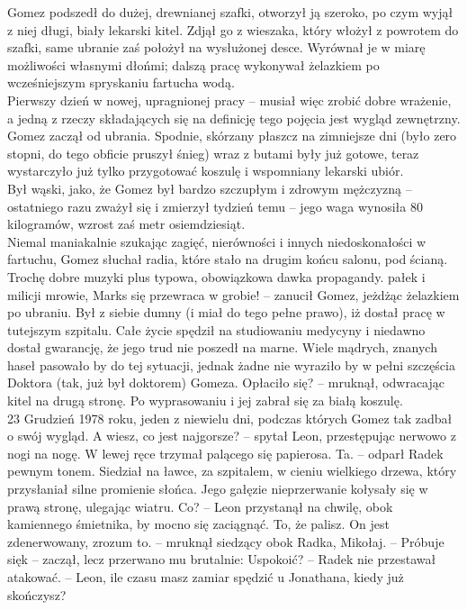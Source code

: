 \documentclass[../MAIN.tex]{subfiles}
\begin{document}
Gomez podszedł do dużej, drewnianej szafki, otworzył ją szeroko, po czym wyjął z niej długi, biały lekarski kitel. Zdjął go z wieszaka, który włożył z powrotem do szafki, same ubranie zaś położył na wysłużonej desce. Wyrównał je w miarę możliwości własnymi dłońmi; dalszą pracę wykonywał żelazkiem po wcześniejszym spryskaniu fartucha wodą.\\
Pierwszy dzień w nowej, upragnionej pracy -- musiał więc zrobić dobre wrażenie, a jedną z rzeczy składających się na definicję tego pojęcia jest wygląd zewnętrzny. Gomez zaczął od ubrania. Spodnie, skórzany płaszcz na zimniejsze dni (było zero stopni, do tego obficie pruszył śnieg) wraz z butami były już gotowe, teraz wystarczyło już tylko przygotować koszulę i wspomniany lekarski ubiór.\\
Był wąski, jako, że Gomez był bardzo szczupłym i zdrowym mężczyzną -- ostatniego razu zważył się i zmierzył tydzień temu -- jego waga wynosiła 80 kilogramów, wzrost zaś metr osiemdziesiąt.\\
Niemal maniakalnie szukając zagięć, nierówności i innych niedoskonałości w fartuchu, Gomez słuchał radia, które stało na drugim końcu salonu, pod ścianą. Trochę dobre muzyki plus typowa, obowiązkowa dawka propagandy.
\sx pałek i milicji mrowie, Marks się przewraca w grobie! -- zanucił Gomez, jeżdżąc żelazkiem po ubraniu.
\qd
Był z siebie dumny (i miał do tego pełne prawo), iż dostał pracę w tutejszym szpitalu. Całe życie spędził na studiowaniu medycyny i niedawno dostał gwarancję, że jego trud nie poszedł na marne.
Wiele mądrych, znanych haseł pasowało by do tej sytuacji, jednak żadne nie wyraziło by w pełni szczęścia Doktora (tak, już był doktorem) Gomeza.
\sx Opłaciło się? -- mruknął, odwracając kitel na drugą stronę. 
\qd
Po wyprasowaniu i jej zabrał się za białą koszulę.\\
23 Grudzień 1978 roku, jeden z niewielu dni, podczas których Gomez tak zadbał o swój wygląd.
\dd
\sx A wiesz, co jest najgorsze? -- spytał Leon, przestępując nerwowo z nogi na nogę. W lewej ręce trzymał palącego się papierosa.
\xx Ta. -- odparł Radek pewnym tonem.
\qd
Siedział na ławce, za szpitalem, w cieniu wielkiego drzewa, który przysłaniał silne promienie słońca. Jego gałęzie nieprzerwanie kołysały się w prawą stronę, ulegając wiatru.
\sx Co? -- Leon przystanął na chwilę, obok kamiennego śmietnika, by mocno się zaciągnąć.
\xx To, że palisz.
\xx On jest zdenerwowany, zrozum to. -- mruknął siedzący obok Radka, Mikołaj. -- Próbuje się\3k -- zaczął, lecz przerwano mu brutalnie:
\xx Uspokoić? -- Radek nie przestawał atakować. -- Leon, ile czasu masz zamiar spędzić u Jonathana, kiedy już skończysz?
\end{document}
